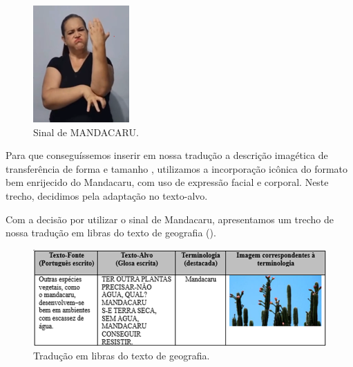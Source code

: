 \documentclass[portuguese]{textolivre}
\begin{document}
\begin{figure}[h!]
    \centering
    \begin{minipage}{0.25\linewidth}
    \includegraphics[width=\linewidth]{Fig5.png}
    \caption{Sinal de MANDACARU.}
    \label{fig5}
    \end{minipage}
\end{figure}

Para que conseguíssemos inserir em nossa tradução a descrição imagética de transferência de forma e tamanho \cite{campello2008visualidade}, utilizamos a incorporação icônica do formato bem enrijecido do Mandacaru, com uso de expressão facial e corporal. Neste trecho, decidimos pela adaptação no texto-alvo. 

Com a decisão por utilizar o sinal de Mandacaru, apresentamos um trecho de nossa tradução em libras do texto de geografia ().

\begin{figure}[h!]
    \centering
    \begin{minipage}{0.85\linewidth}
    \includegraphics[width=\linewidth]{Fig6.png}
    \caption{Tradução em libras do texto de geografia.}
    \label{fig6}
    \end{minipage}
\end{figure}
\end{document}
